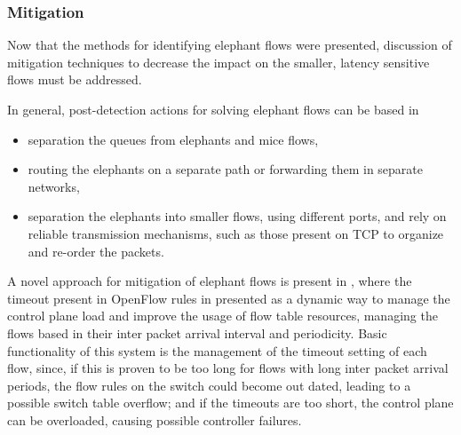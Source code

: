 \subsubsection{Mitigation}

Now that the methods for identifying elephant flows were presented, discussion of mitigation techniques to decrease the impact on the smaller, latency sensitive
flows must be addressed. 

\par In general, post-detection actions for solving elephant flows can be based in \cite{pettit_open_2014, noauthor_mice_2013}

\begin{itemize}
    \item separation the queues from elephants and mice flows,
    \item routing the elephants on a separate path or forwarding them in separate networks,
    \item separation the elephants into smaller flows, using different ports, and rely on reliable transmission mechanisms, such as those present on TCP
        to organize and re-order the packets.
\end{itemize}

\par A novel approach for mitigation of elephant flows is present in \cite{zhu_intelligent_2015}, where the timeout present in OpenFlow rules in presented as 
a dynamic way to manage the control plane load and improve the usage of flow table resources, managing the flows based in their inter packet arrival interval and
periodicity. Basic functionality of this system is the management of the timeout setting of each flow, since, if this is proven to be too long for flows with 
long inter packet arrival periods, the flow rules on the switch could become out dated, leading to a possible switch table overflow; and if the timeouts are 
too short, the control plane can be overloaded, causing possible controller failures.

